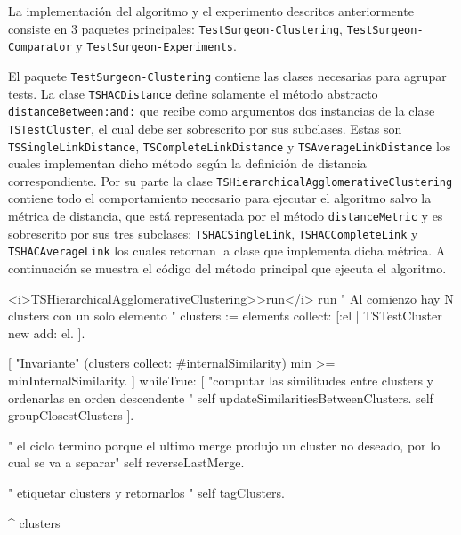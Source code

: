 \par La implementación del algoritmo y el experimento descritos anteriormente consiste en 3 paquetes principales: {\tt TestSurgeon-Clustering},  {\tt TestSurgeon-Comparator} y {\tt TestSurgeon-Experiments}. 


\par El paquete {\tt TestSurgeon-Clustering} contiene las clases necesarias para agrupar tests. La clase {\tt TSHACDistance} define solamente el método abstracto {\tt distanceBetween:and:} que recibe como argumentos dos instancias de la clase {\tt TSTestCluster}, el cual debe ser sobrescrito por sus subclases. Estas son {\tt TSSingleLinkDistance}, {\tt TSCompleteLinkDistance} y {\tt TSAverageLinkDistance} los cuales implementan dicho método según la definición de distancia correspondiente. Por su parte la clase {\tt TSHierarchicalAgglomerativeClustering} contiene todo el comportamiento necesario para ejecutar el algoritmo salvo la métrica de distancia, que está representada por el método {\tt distanceMetric} y es sobrescrito por sus tres subclases: {\tt TSHACSingleLink}, {\tt TSHACCompleteLink} y {\tt TSHACAverageLink} los cuales retornan la clase que implementa dicha métrica. A continuación se muestra el código del método principal que ejecuta el algoritmo.

\newpage

\begin{codeWithLineNumbers}
<i>TSHierarchicalAgglomerativeClustering>>run</i>
run
	" Al comienzo hay N clusters con un solo elemento "
	clusters := elements collect: [:el | TSTestCluster new add: el. ].
	
	[
		"Invariante"
		(clusters collect: #internalSimilarity) min >= minInternalSimilarity.
	] 
		whileTrue: [ 
			"computar las similitudes entre clusters y ordenarlas en orden descendente "
			self updateSimilaritiesBetweenClusters.
			self groupClosestClusters
	].
		
	" el ciclo termino porque el ultimo merge produjo un cluster no deseado, por lo cual se va a separar"
	self reverseLastMerge. 
	
	" etiquetar clusters y retornarlos "
	self tagClusters.
	
	^ clusters
\end{codeWithLineNumbers}
 
